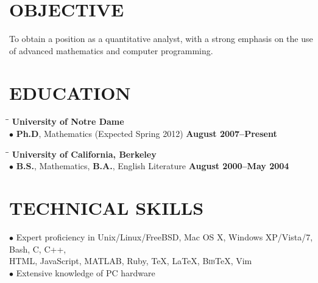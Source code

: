 \documentclass{resume}
\begin{document}
\begin{resume}

  \section{OBJECTIVE}  \vspace{0.05in}
  To obtain a position as a quantitative analyst, with a strong emphasis on the use of advanced mathematics and computer programming. 

	\section{EDUCATION}  \vspace{0.05in}
	\begin{tabbing}
\hspace{2.3in}\= \hspace{2.6in}\= \kill
\textbf{University of Notre Dame} \\
$\bullet$ \textbf{Ph.D}, Mathematics (Expected Spring 2012) \>\>\textbf{August 2007--Present}
\\ 
      \end{tabbing}	
	\vspace{-0.5in} 
	\begin{tabbing}
\hspace{2.3in}\= \hspace{2.6in}\= \kill
\textbf{University of California, Berkeley}
\\
$\bullet$ \textbf{B.S.}, Mathematics, \textbf{B.A.}, English Literature \>\>\textbf{August 2000--May 2004}
\end{tabbing}

\section{TECHNICAL SKILLS} \vspace{0.05in}
	$\bullet$ Expert proficiency in 
	Unix/Linux/FreeBSD, Mac OS X, Windows XP/Vista/7, Bash, C, C++, \\
	\phantom{$\bullet$} HTML, 
JavaScript, MATLAB, Ruby, \TeX{}, \LaTeX{}, B\textsc{ib}\TeX{}, Vim\\
	$\bullet$ Extensive knowledge of PC hardware 

\end{resume}
\end{document}
